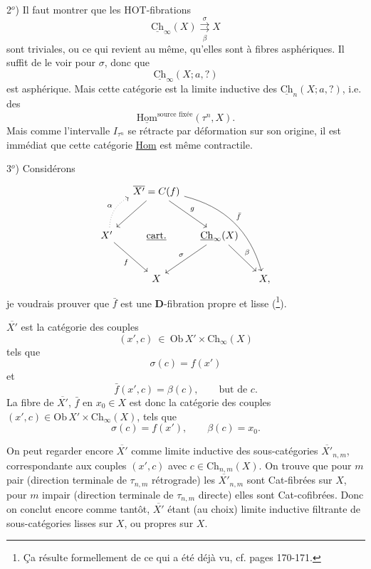 \documentclass[11pt]{article}
\newcommand{\printedpage}[1]{\marginpar{\footnotesize p.~#1}}
\newcommand{\msp}[1]{\marginpar{\footnotesize [#1]}}
\newcommand{\Ch}{\underline{\mathrm{Ch}}}
\newcommand{\Xb}{\overline{X'}}
\begin{document}
2$^o$) Il faut montrer que les HOT-fibrations
\[
\Ch_\infty(X) \overset{\sigma}{\underset{\beta}{\rightrightarrows}} X
\]
sont triviales, ou ce qui revient au même, qu'elles sont à fibres asphériques. Il suffit de le voir pour $\sigma$, donc que
\[
\Ch_\infty(X;a,?)
\]
est asphérique. Mais cette catégorie est la limite inductive des $\Ch_n(X;a,?)$, i.e. des
\[
\underline{\mathrm{Hom}}^{\text{source fixée}}(\tau^n, X).
\]
Mais comme l'intervalle $I_{\tau^n}$ se rétracte par déformation sur son origine, il est immédiat que cette catégorie \underline{Hom} est même contractile.

3$^o$) Considérons
\[
\begin{tikzcd}[column sep=small, row sep=large]
 & \Xb = C(f) \arrow[dl] \arrow[dr, "g"] \arrow[ddrr, bend left, "\bar f"] & & \\
X' \arrow[ur, dotted, bend left, "\alpha"] \arrow[dr, "f"'] & \underline{\text{cart.}} & \Ch_\infty(X) \arrow[dl, "\sigma"'] \arrow[dr, "\beta"] & \\
 & X & & X,
\end{tikzcd}
\]
\msp{page 153}
je voudrais prouver que $\bar f$ est une \textbf{D}-fibration propre et lisse (\footnote[38]{Ça résulte formellement de ce qui a été déjà vu, cf. pages 170-171.}).

$\Xb$ est la catégorie des couples
\[
(x',c) \ \in \ \mathrm{Ob}\,X' \times \mathrm{Ch}_\infty(X)
\]
tels que
\[
\sigma(c) = f(x')
\]
et
\[
\bar f(x',c) = \beta(c), \qquad \text{but de } c.
\]
La fibre de $\Xb$, $\bar f$ en $x_0 \in X$ est donc la catégorie des couples $(x',c) \in \mathrm{Ob}\,X' \times \mathrm{Ch}_\infty(X)$, tels que
\[
\sigma(c) = f(x'), \qquad \beta(c) = x_0.
\]

\printedpage{96}
On peut regarder encore $\Xb$ comme limite inductive des sous-catégories $\Xb_{n,m}$, correspondante aux couples $(x',c)$ avec $c \in \mathrm{Ch}_{n,m}(X)$. On trouve que pour $m$ pair (direction terminale de $\tau_{n,m}$ rétrograde) les $\Xb_{n,m}$ sont Cat-fibrées sur $X$, pour $m$ impair (direction terminale de $\tau_{n,m}$ directe) elles sont Cat-cofibrées. Donc on conclut encore comme tantôt, $\Xb$ étant (au choix) limite inductive filtrante de sous-catégories lisses sur $X$, ou propres sur $X$. %
\end{document}

